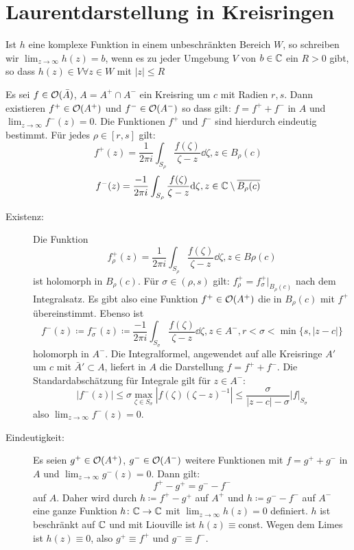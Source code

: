\section{Laurentdarstellung in Kreisringen}
\begin{definition}
	Ist $ h $ eine komplexe Funktion in einem unbeschr\"ankten Bereich $ W $, so schreiben wir $ \lim_{z\to\infty}h(z)=b $, wenn es zu jeder Umgebung $ V $ von $ b\in\mathbb{C} $ ein $ R>0 $ gibt, so dass $ h(z)\in V\forall z\in W $ mit $ |z|\leq R $
\end{definition}
\begin{satz}
	Es sei $ f\in\mathcal O(\bar A) $, $ A=A^+\cap A^- $ ein Kreisring um $ c $ mit Radien $ r,s $. Dann existieren $ f^+\in\mathcal O(A^+) $ und $ f^-\in\mathcal O(A^-) $ so dass gilt: $ f=f^++f^- $ in $ A $ und $ \lim_{z\to\infty} f^-(z)=0 $. Die Funktionen $ f^+ $ und $ f^- $ sind hierdurch eindeutig bestimmt. F\"ur jedes $ \rho\in[r,s] $ gilt:
	\[ f^+(z)=\frac{1}{2\pi i}\int_{S_\rho}\frac{f(\zeta)}{\zeta-z}\dd\zeta,z\in B_\rho(c) \]
	\[ f^-(z)=\frac{-1}{2\pi i}\int_{S_\rho}\frac{f(\zeta)}{\zeta-z}\mathrm d\zeta,z\in\mathbb{C}\setminus\overline{B_\rho(c)} \]
\end{satz}
\begin{beweis}
	\begin{description}
		\item[Existenz:] Die Funktion \[ f^+_\rho(z)=\frac{1}{2\pi i}\int_{S_{\rho}}\frac{f(\zeta)}{\zeta-z}\dd\zeta, z\in B\rho(c) \] ist holomorph in $ B_\rho(c) $. F\"ur $ \sigma\in(\rho, s) $ gilt: $ f^+_{\rho}=f^+_\sigma|_{B_\rho(c)} $ nach dem Integralsatz. Es gibt also eine Funktion $ f^+\in\mathcal O(A^+) $ die in $ B_\rho(c) $	mit $ f^+ $ \"ubereinstimmt. Ebenso ist
		\[ f^-(z)\coloneqq f^-_\sigma(z)\coloneqq\frac{-1}{2\pi i}\int_{S_\sigma}\frac{f(\zeta)}{\zeta-z}\dd\zeta,z\in A^-, r<\sigma<\min\lbrace s,|z-c|\rbrace \]
		holomorph in $ A^- $. Die Integralformel, angewendet auf alle Kreisringe $ A' $ um $ c $ mit $ \bar A'\subset A $, liefert in $ A $ die Darstellung $ f=f^++f^- $. Die Standardabsch\"atzung f\"ur Integrale gilt f\"ur $ z\in A^- $:
		\[ |f^-(z)|\leq\sigma\max_{\zeta\in S_\sigma}|f(\zeta)(\zeta-z)^{-1}|\leq\frac{\sigma}{|z-c|-\sigma}|f|_{S_\sigma} \]
		also $ \lim_{z\to\infty}f^-(z)=0 $.
		\item[Eindeutigkeit:] Es seien $ g^+\in\mathcal O(A^+) $, $ g^-\in\mathcal O(A^-) $ weitere Funktionen mit $ f=g^++g^- $ in $ A $ und $ \lim_{z\to\infty} g^-(z)=0 $. Dann gilt:
		\[ f^+-g^+=g^--f^- \]
		auf $ A $. Daher wird durch $ h\coloneqq f^+-g^+ $ auf $ A^+ $ und $ h\coloneqq g^--f^- $ auf $ A^- $ eine ganze Funktion $ h\colon\mathbb{C}\rightarrow\mathbb{C} $ mit $ \lim_{z\to\infty}h(z)=0 $ definiert. $ h $ ist beschr\"ankt auf $ \mathbb{C} $ und mit Liouville ist $ h(z)\equiv $const. Wegen dem Limes ist $ h(z)\equiv 0 $, also $ g^+\equiv f^+ $ und $ g^-\equiv f^- $.
	\end{description}
\end{beweis}
